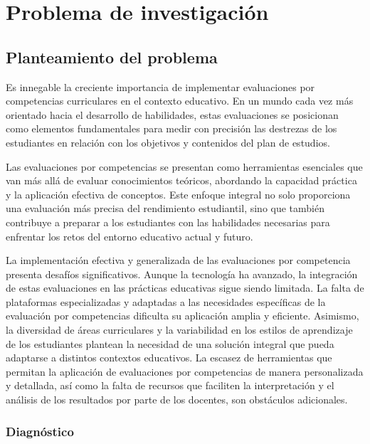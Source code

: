 
\section{Problema de investigación}

\subsection{Planteamiento del problema}

Es innegable la creciente importancia de implementar evaluaciones por competencias curriculares en el contexto educativo. En un mundo cada vez más orientado hacia el desarrollo de habilidades, estas evaluaciones se posicionan como elementos fundamentales para medir con precisión las destrezas de los estudiantes en relación con los objetivos y contenidos del plan de estudios.

Las evaluaciones por competencias se presentan como herramientas esenciales que van más allá de evaluar conocimientos teóricos, abordando la capacidad práctica y la aplicación efectiva de conceptos. Este enfoque integral no solo proporciona una evaluación más precisa del rendimiento estudiantil, sino que también contribuye a preparar a los estudiantes con las habilidades necesarias para enfrentar los retos del entorno educativo actual y futuro.

La implementación efectiva y generalizada de las evaluaciones por competencia presenta desafíos significativos. Aunque la tecnología ha avanzado, la integración de estas evaluaciones en las prácticas educativas sigue siendo limitada. La falta de plataformas especializadas y adaptadas a las necesidades específicas de la evaluación por competencias dificulta su aplicación amplia y eficiente. Asimismo, la diversidad de áreas curriculares y la variabilidad en los estilos de aprendizaje de los estudiantes plantean la necesidad de una solución integral que pueda adaptarse a distintos contextos educativos. La escasez de herramientas que permitan la aplicación de evaluaciones por competencias de manera personalizada y detallada, así como la falta de recursos que faciliten la interpretación y el análisis de los resultados por parte de los docentes, son obstáculos adicionales.

\subsubsection*{Diagnóstico}

